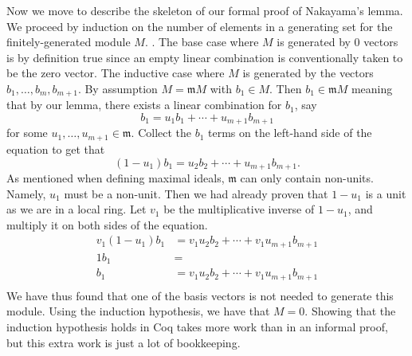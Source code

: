 \documentclass{article}
\begin{document}
Now we move to describe the skeleton of our formal proof of Nakayama's lemma. 
We proceed by induction on the number of elements in a generating set for the finitely-generated module $M$. 
. The base case where \(M\) is generated by 0 vectors is by
definition true since an empty linear combination is conventionally taken to be
the zero vector. 
The inductive case where \(M\) is generated by the vectors
\(b_{1}, \dots, b_{m}, b_{m+1}\). By assumption \(M = \mathfrak{m} M\) with
\(b_{1}\in M\). Then \(b_{1}\in\mathfrak{m} M\) meaning that by our lemma,
there exists a linear combination for \(b_{1}\), say
\[b_{1} = u_{1} b_{1} + \cdots + u_{m+1} b_{m+1}\]
for some \(u_{1}, \dots, u_{m+1}\in\mathfrak{m}\). Collect the \(b_{1}\) terms
on the left-hand side of the equation to get that
\[(1 - u_{1}) b_{1} = u_{2} b_{2} + \cdots + u_{m+1} b_{m+1}\text{.}\]
As mentioned when defining maximal ideals, \(\mathfrak{m}\) can only contain
non-units. Namely, \(u_{1}\) must be a non-unit. Then we had already proven
that \(1 - u_{1}\) is a unit as we are in a local ring. Let \(v_{1}\) be the
multiplicative inverse of \(1 - u_{1}\), and multiply it on both sides of the
equation.
\begin{align*}
  v_{1} (1 - u_{1}) b_{1}
    & = v_{1} u_{2} b_{2} + \cdots + v_{1} u_{m+1} b_{m+1} \\
  1 b_{1} & = \\
  b_{1} & = v_{1} u_{2} b_{2} + \cdots + v_{1} u_{m+1} b_{m+1} \\
\end{align*}
We have thus found that one of the basis vectors is not needed to generate this
module. Using the induction hypothesis, we have that \(M = 0\). Showing that
the induction hypothesis holds in Coq takes more work than in an informal
proof, but this extra work is just a lot of bookkeeping.



\end{document}

